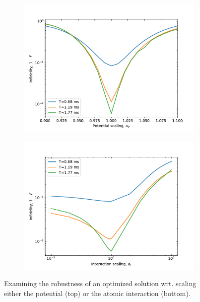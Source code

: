 \documentclass[aps,pra,reprint,superscriptaddress]{revtex4-1}
\begin{document}
\begin{figure}
	\begin{subfigure}{\columnwidth}
		\centering
		\includegraphics[width=\columnwidth]{graphics/newrobustness/robustness.pdf}
	\end{subfigure}
	\begin{subfigure}{\columnwidth}
		\centering
		\includegraphics[width=\columnwidth]{graphics/newrobustness/interactionRobustness.pdf}
	\end{subfigure}
	\caption{Examining the robustness of an optimized solution wrt. scaling either the potential (top) or the atomic interaction (bottom).}
	\label{fig:robustness}
\end{figure}
\end{document}
